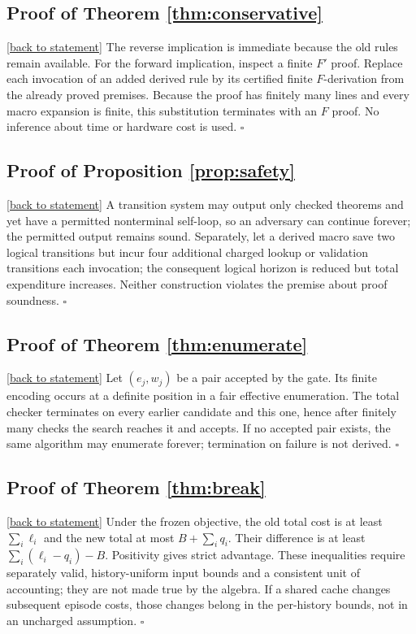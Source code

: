 \documentclass[11pt,letterpaper]{article}
\theoremstyle{definition}
\theoremstyle{remark}
\newcommand{\backlink}[1]{\hyperlink{claim:#1}{\footnotesize[back to statement]}}
\begin{document}
\hypertarget{proof:conservative}{}\subsection*{Proof of Theorem \ref{thm:conservative}}\backlink{conservative}
The reverse implication is immediate because the old rules remain available. For the forward implication, inspect a finite $F'$ proof. Replace each invocation of an added derived rule by its certified finite $F$-derivation from the already proved premises. Because the proof has finitely many lines and every macro expansion is finite, this substitution terminates with an $F$ proof. No inference about time or hardware cost is used. $\square$

\hypertarget{proof:safety}{}\subsection*{Proof of Proposition \ref{prop:safety}}\backlink{safety}
A transition system may output only checked theorems and yet have a permitted nonterminal self-loop, so an adversary can continue forever; the permitted output remains sound. Separately, let a derived macro save two logical transitions but incur four additional charged lookup or validation transitions each invocation; the consequent logical horizon is reduced but total expenditure increases. Neither construction violates the premise about proof soundness. $\square$

\hypertarget{proof:enumerate}{}\subsection*{Proof of Theorem \ref{thm:enumerate}}\backlink{enumerate}
Let $(e_j,w_j)$ be a pair accepted by the gate. Its finite encoding occurs at a definite position in a fair effective enumeration. The total checker terminates on every earlier candidate and this one, hence after finitely many checks the search reaches it and accepts. If no accepted pair exists, the same algorithm may enumerate forever; termination on failure is not derived. $\square$

\hypertarget{proof:break}{}\subsection*{Proof of Theorem \ref{thm:break}}\backlink{break}
Under the frozen objective, the old total cost is at least $\sum_i\ell_i$ and the new total at most $B+\sum_iq_i$. Their difference is at least $\sum_i(\ell_i-q_i)-B$. Positivity gives strict advantage. These inequalities require separately valid, history-uniform input bounds and a consistent unit of accounting; they are not made true by the algebra. If a shared cache changes subsequent episode costs, those changes belong in the per-history bounds, not in an uncharged assumption. $\square$
\end{document}
